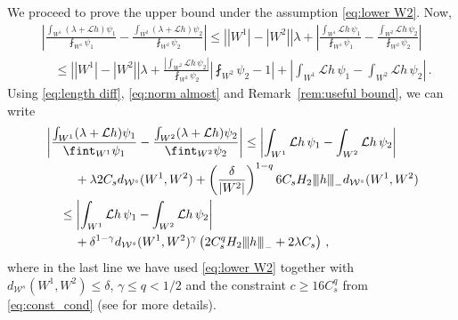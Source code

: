\documentclass{amsart}
\numberwithin{equation}{section}
\newcommand\cL{{\mathcal L}}
\newcommand\cW{{\mathcal W}}
\newcommand{\tri}{{|\:\!\!|\:\!\!|}}
\begin{document}
We proceed to prove the upper bound under the assumption \eqref{eq:lower W2}.  Now,
\[
\begin{split}
& \left|\frac{\int_{W^1} (\lambda + \cL h ) \psi_1}{\fint_{W^1}\psi_1}  - \frac{\int_{W^2} (\lambda+  \cL h) \psi_2}{\fint_{W^2}\psi_2} \right|
\leq \left| |W^1| - |W^2| \right| \lambda + \left|\frac{\int_{W^1} \cL h \, \psi_1}{\fint_{W^1}\psi_1}  - \frac{\int_{W^2} \cL h \, \psi_2}{\fint_{W^2}\psi_2} \right| \\
& \quad \leq \left| |W^1| - |W^2| \right| \lambda
 + \frac{\left| \int_{W^2} \cL h \, \psi_2 \right|}{\fint_{W^2} \psi_2}
\left| \fint_{W^2} \psi_2 -1 \right| 
+ \left| \int_{W^1} \cL h \, \psi_1 - \int_{W^2} \cL h \, \psi_2 \right| \, .
\end{split}
\]
Using \eqref{eq:length diff}, \eqref{eq:norm almost} and 
Remark~\ref{rem:useful bound}, we can write
\begin{equation}
\label{eq:focus}
\begin{split}
& \left|\frac{\int_{W^1} (\lambda + \cL h ) \psi_1}{\fint_{W^1}\psi_1}   -  \frac{\int_{W^2} (\lambda+  \cL h) \psi_2}{\fint_{W^2}\psi_2} \right|
 \le \left| \int_{W^1} \cL h \, \psi_1 - \int_{W^2} \cL h \, \psi_2 \right| \\
& \hskip24pt+ \lambda 2 C_s d_{\cW^s}(W^1, W^2) +\left( \frac{\delta}{|W^2|}\right)^{1-q} 6 C_s H_2  \tri h \tri_-  d_{\cW^s}(W^1, W^2) \\
& \hskip12pt \le \left| \int_{W^1} \cL h \, \psi_1 - \int_{W^2} \cL h \, \psi_2 \right|\\
& \hskip24pt+ \delta^{1-\gamma} d_{\cW^s}(W^1, W^2)^\gamma \left( 2 C_s^q H_2 \tri h \tri_- + 2\lambda C_s \right) \, ,
\end{split}
\end{equation}
where in the last line we have used \eqref{eq:lower W2} together with $d_{\cW^s}(W^1, W^2) \le \delta$,
$\gamma \le q < 1/2$ and the constraint $c \ge 16 C_s^q$ from \eqref{eq:const_cond} (see \cite[eq.~(5.7)]{DL22}for more details).
\end{document}
